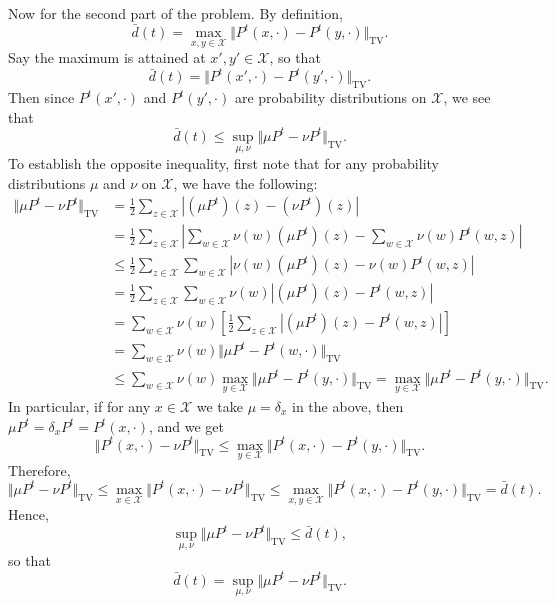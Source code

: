 \documentclass[12pt]{article}
\begin{document}
Now for the second part of the problem. By definition,
\begin{equation*}
\bar{d}(t) = \max_{x, y \in \mathcal{X}} \Vert P^t(x, \cdot) - P^t(y, \cdot) \Vert_\mathrm{TV}.
\end{equation*}
Say the maximum is attained at $x', y' \in \mathcal{X}$, so that
\begin{equation*}
\bar{d}(t) = \Vert P^t(x', \cdot) - P^t(y', \cdot) \Vert_\mathrm{TV}.
\end{equation*}
Then since $P^t(x', \cdot)$ and $P^t(y', \cdot)$ are probability distributions on $\mathcal{X}$, we see that
\begin{equation*}
\bar{d}(t) \leq \sup_{\mu, \nu} \Vert \mu P^t - \nu P^t \Vert_\mathrm{TV}.
\end{equation*}
To establish the opposite inequality, first note that for any probability distributions $\mu$ and $\nu$ on $\mathcal{X}$, we have the following:
\begin{align*}
\Vert \mu P^t - \nu P^t \Vert_\mathrm{TV} &= \frac{1}{2} \sum_{z \in \mathcal{X}} \left| (\mu P^t)(z) - (\nu P^t)(z) \right| \\
&= \frac{1}{2} \sum_{z \in \mathcal{X}} \left| \sum_{w \in \mathcal{X}} \nu(w) (\mu P^t)(z) - \sum_{w \in \mathcal{X}} \nu(w) P^t(w, z) \right| \\
&\leq \frac{1}{2} \sum_{z \in \mathcal{X}} \sum_{w \in \mathcal{X}} \left| \nu(w) (\mu P^t)(z) - \nu(w) P^t(w, z) \right| \\
&= \frac{1}{2} \sum_{z \in \mathcal{X}} \sum_{w \in \mathcal{X}} \nu(w) \left| (\mu P^t)(z) - P^t(w, z) \right| \\
&= \sum_{w \in \mathcal{X}} \nu(w) \left[\frac{1}{2} \sum_{z \in \mathcal{X}} \left| (\mu P^t)(z) - P^t(w, z) \right|\right] \\
&= \sum_{w \in \mathcal{X}} \nu(w) \Vert \mu P^t - P^t(w, \cdot) \Vert_\mathrm{TV} \\
&\leq \sum_{w \in \mathcal{X}} \nu(w) \max_{y \in \mathcal{X}} \Vert \mu P^t - P^t(y, \cdot) \Vert_\mathrm{TV} = \max_{y \in \mathcal{X}} \Vert \mu P^t - P^t(y, \cdot) \Vert_\mathrm{TV}.
\end{align*}
In particular, if for any $x \in \mathcal{X}$ we take $\mu = \delta_x$ in the above, then $\mu P^t = \delta_x P^t = P^t(x, \cdot)$, and we get
\begin{equation*}
\Vert P^t(x, \cdot) - \nu P^t \Vert_\mathrm{TV} \leq \max_{y \in \mathcal{X}} \Vert P^t(x, \cdot) - P^t(y, \cdot) \Vert_\mathrm{TV}.
\end{equation*}
Therefore,
\begin{equation*}
\Vert \mu P^t - \nu P^t \Vert_\mathrm{TV} \leq \max_{x \in \mathcal{X}} \Vert P^t(x, \cdot) - \nu P^t \Vert_\mathrm{TV} \leq \max_{x, y \in \mathcal{X}} \Vert P^t(x, \cdot) - P^t(y, \cdot) \Vert_\mathrm{TV} = \bar{d}(t).
\end{equation*}
Hence,
\begin{equation*}
\sup_{\mu, \nu} \Vert \mu P^t - \nu P^t \Vert_\mathrm{TV} \leq \bar{d}(t),
\end{equation*}
so that
\begin{equation*}
\bar{d}(t) = \sup_{\mu, \nu} \Vert \mu P^t - \nu P^t \Vert_\mathrm{TV}.
\end{equation*}
\end{document}
